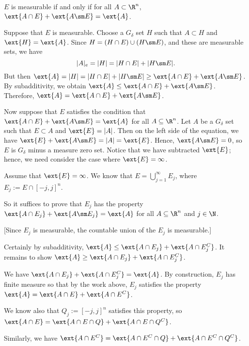 \begin{thm} \label{thm:cara}
$E$ is measurable if and only if for all $A \subset \R^n$, $\ext{A \cap E}+\ext{A\sm E}=\ext{A}$.
\end{thm}

\pf Suppose that $E$ is measurable. Choose a $G_\delta$ set $H$ such that $A \subset H$ and $\ext{H}=\ext{A}$. Since $H= (H \cap E) \cup (H \sm E)$, and these are measurable sets, we have
	\[
	|A|_e=|H|= |H \cap E| + |H \sm E|.
	\]
But then $\ext{A} = |H|= |H \cap E| + |H\sm E| \geq \ext{A \cap E} + \ext{A \sm E}$. By subadditivity, we obtain $\ext{A} \leq \ext{A \cap E} + \ext{A \sm E}$. Therefore, $\ext{A}= \ext{A \cap E} + \ext{A \sm E}$.

Now suppose that $E$ satisfies the condition that $\ext{A \cap E}+\ext{A\sm E}=\ext{A}$ for all $A \subseteq \R^n$. Let $A$ be a $G_\delta$ set such that $E \subset A$ and $\ext{E}=|A|$. Then on the left side of the equation, we have $\ext{E}+\ext{A\sm E}= |A|=\ext{E}$. Hence, $\ext{A \sm E}=0$, so $E$ is $G_\delta$ minus a measure zero set. Notice that we have subtracted $\ext{E}$; hence, we need consider the case where $\ext{E}=\infty$.





Assume that $\ext{E}=\infty$. We know that $E= \bigcup_{j=1}^\infty E_j$, where $E_j:= E \cap [-j,j]^n$. 




So it suffices to prove that $E_j$ has the property $\ext{A \cap E_j}+\ext{A\sm E_j}=\ext{A}$ for all $A \subseteq \R^n$ and $j \in \N$. 


[Since $E_j$ is measurable, the countable union of the $E_j$ is measurable.] 


Certainly by subadditivity, $\ext{A} \leq  \ext{A \cap E_j} + \ext{A \cap E_j^C}$. It remains to show $\ext{A} \geq  \ext{A \cap E_j} + \ext{A \cap E_j^C}$. 




We have $\ext{A \cap E_j} + \ext{A \cap E_j^C}=\ext{A}$. By construction, $E_j$ has finite measure so that by the work above, $E_j$ satisfies the property $\ext{A}= \ext{A \cap E} + \ext{A \cap E^C}$. 




We know also that $Q_j:= [-j,j]^n$ satisfies this property, so $\ext{A \cap E}= \ext{A \cap E \cap Q}+ \ext{A \cap E \cap Q^C}$. 


Similarly, we have $\ext{A \cap E^C}= \ext{A \cap E^C \cap Q}+ \ext{A \cap E^C \cap Q^C}$. 





